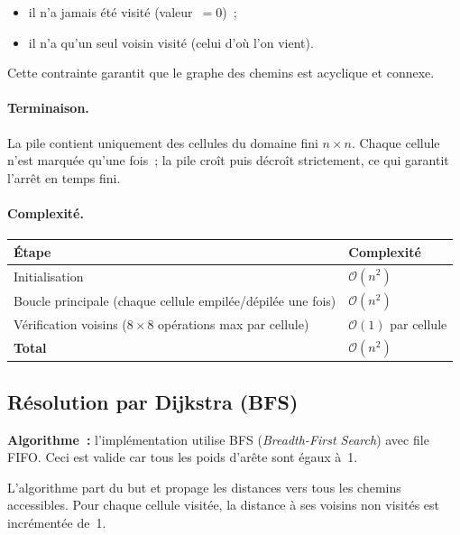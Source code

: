 \documentclass[12pt, a4paper]{article}
\theoremstyle{definition}
\theoremstyle{remark}
\newcommand{\bigO}[1]{\mathcal{O}\!\left(#1\right)}
\begin{document}
\begin{itemize}
    \item il n'a jamais été visité (valeur~$= 0$)~;
    \item il n'a qu'un seul voisin visité (celui d'où l'on vient).
\end{itemize}

Cette contrainte garantit que le graphe des chemins est acyclique et connexe.

\paragraph{Terminaison.}
La pile contient uniquement des cellules du domaine fini $n \times n$.
Chaque cellule n'est marquée qu'une fois~; la pile croît puis décroît strictement,
ce qui garantit l'arrêt en temps fini.

\paragraph{Complexité.}

\begin{center}
\begin{tabular}{ll}
    \toprule
    Étape & Complexité \\
    \midrule
    Initialisation & $\bigO{n^2}$ \\
    Boucle principale (chaque cellule empilée/dépilée une fois) & $\bigO{n^2}$ \\
    Vérification voisins ($8 \times 8$ opérations max par cellule) & $\bigO{1}$ par cellule \\
    \midrule
    \textbf{Total} & $\bigO{n^2}$ \\
    \bottomrule
\end{tabular}
\end{center}

\subsection{Résolution par Dijkstra (BFS)}

\textbf{Algorithme~:} l'implémentation utilise BFS (\emph{Breadth-First Search})
avec file FIFO. Ceci est valide car tous les poids d'arête sont égaux à~1.

L'algorithme part du but et propage les distances vers tous les chemins accessibles.
Pour chaque cellule visitée, la distance à ses voisins non visités est incrémentée de~1.
\end{document}
